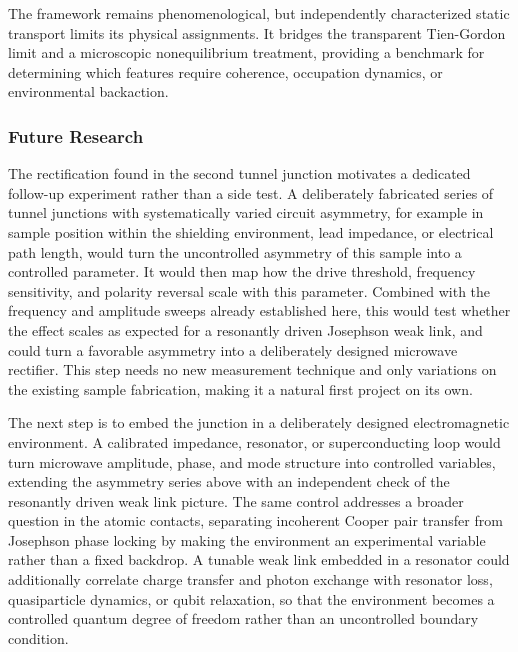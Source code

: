         The framework remains phenomenological, but independently characterized static transport limits its physical assignments. It bridges the transparent Tien-Gordon limit and a microscopic nonequilibrium treatment, providing a benchmark for determining which features require coherence, occupation dynamics, or environmental backaction.

    \subsubsection*{Future Research}

        The rectification found in the second tunnel junction motivates a dedicated follow-up experiment rather than a side test. A deliberately fabricated series of tunnel junctions with systematically varied circuit asymmetry, for example in sample position within the shielding environment, lead impedance, or electrical path length, would turn the uncontrolled asymmetry of this sample into a controlled parameter. It would then map how the drive threshold, frequency sensitivity, and polarity reversal scale with this parameter. Combined with the frequency and amplitude sweeps already established here, this would test whether the effect scales as expected for a resonantly driven Josephson weak link, and could turn a favorable asymmetry into a deliberately designed microwave rectifier. This step needs no new measurement technique and only variations on the existing sample fabrication, making it a natural first project on its own.

        The next step is to embed the junction in a deliberately designed electromagnetic environment. A calibrated impedance, resonator, or superconducting loop would turn microwave amplitude, phase, and mode structure into controlled variables, extending the asymmetry series above with an independent check of the resonantly driven weak link picture. The same control addresses a broader question in the atomic contacts, separating incoherent Cooper pair transfer from Josephson phase locking by making the environment an experimental variable rather than a fixed backdrop. A tunable weak link embedded in a resonator could additionally correlate charge transfer and photon exchange with resonator loss, quasiparticle dynamics, or qubit relaxation, so that the environment becomes a controlled quantum degree of freedom rather than an uncontrolled boundary condition.

